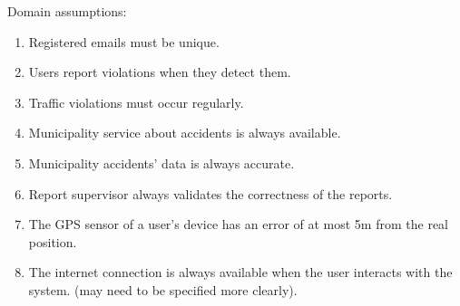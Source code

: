 Domain assumptions:
\begin{enumerate}[label={D\arabic*.}]
	\item Registered emails must be unique.
    \item Users report violations when they detect them.
    \item Traffic violations must occur regularly.
    \item Municipality service about accidents is always available.
   	\item Municipality accidents' data is always accurate.
    \item Report supervisor always validates the correctness of the reports.
    \item The GPS sensor of a user's device has an error of at most 5m from the real position.
    \item The internet connection is always available when the user interacts with the system. (may need to be specified more clearly).
\end{enumerate}
